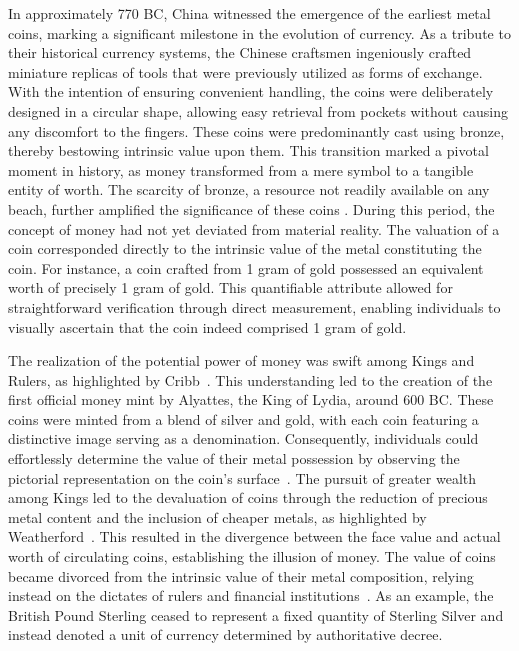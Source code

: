 In approximately 770 BC, China witnessed the emergence of the earliest metal coins, marking a significant milestone in the evolution of currency.
As a tribute to their historical currency systems, the Chinese craftsmen ingeniously crafted miniature replicas of tools that were previously
utilized as forms of exchange. With the intention of ensuring convenient handling, the coins were deliberately designed in a circular shape,
allowing easy retrieval from pockets without causing any discomfort to the fingers. These coins were predominantly cast using bronze, thereby
bestowing intrinsic value upon them. This transition marked a pivotal moment in history, as money transformed from a mere symbol to a tangible
entity of worth. The scarcity of bronze, a resource not readily available on any beach, further amplified the significance of these coins
\cite{li2003, hartill2005}. During this period, the concept of money had not yet deviated from material reality. The valuation of a coin
corresponded directly to the intrinsic value of the metal constituting the coin. For instance, a coin crafted from 1 gram of gold possessed
an equivalent worth of precisely 1 gram of gold. This quantifiable attribute allowed for straightforward verification through direct measurement,
enabling individuals to visually ascertain that the coin indeed comprised 1 gram of gold.

The realization of the potential power of money was swift among Kings and Rulers, as highlighted by Cribb~\cite{cribb1991}. This understanding
led to the creation of the first official money mint by Alyattes, the King of Lydia, around 600 BC. These coins were minted from a blend of
silver and gold, with each coin featuring a distinctive image serving as a denomination. Consequently, individuals could effortlessly determine
the value of their metal possession by observing the pictorial representation on the coin's surface~\cite{deVries2008}. The pursuit of greater
wealth among Kings led to the devaluation of coins through the reduction of precious metal content and the inclusion of cheaper metals, as
highlighted by Weatherford~\cite{weatherford1997}. This resulted in the divergence between the face value and actual worth of circulating coins,
establishing the illusion of money. The value of coins became divorced from the intrinsic value of their metal composition, relying instead on
the dictates of rulers and financial institutions~\cite{ferguson2009}. As an example, the British Pound Sterling ceased to represent a fixed
quantity of Sterling Silver and instead denoted a unit of currency determined by authoritative decree.

